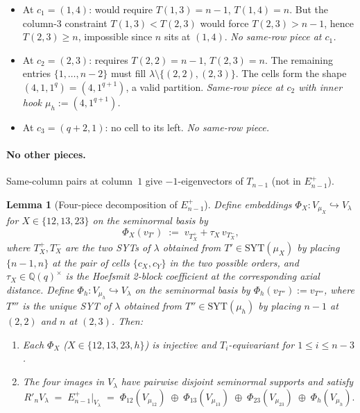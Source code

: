 \documentclass[11pt]{article}
\newtheorem{lemma}[theorem]{Lemma}
\theoremstyle{definition}
\newcommand{\SYT}{\mathrm{SYT}}
\newcommand{\Rp}{{R'}}
\begin{document}
\begin{itemize}[topsep=0.2em,itemsep=0.1em]
\item At $c_1 = (1, 4)$: would require $T(1, 3) = n-1$, $T(1, 4) = n$.
   But the column-$3$ constraint $T(1, 3) < T(2, 3)$ would force
   $T(2, 3) > n - 1$, hence $T(2, 3) \ge n$, impossible since $n$ sits
   at $(1, 4)$.  \emph{No same-row piece at $c_1$.}
\item At $c_2 = (2, 3)$: requires $T(2, 2) = n-1$, $T(2, 3) = n$.
   The remaining entries $\{1, \ldots, n-2\}$ must fill
   $\lambda \setminus \{(2, 2), (2, 3)\}$.  The cells form the shape
   $(4, 1, 1^q) = (4, 1^{q+1})$, a valid partition.
   \emph{Same-row piece at $c_2$ with inner hook $\mu_h := (4, 1^{q+1})$.}
\item At $c_3 = (q+2, 1)$: no cell to its left.  \emph{No same-row piece.}
\end{itemize}

\paragraph{No other pieces.}  Same-column pairs at column~$1$ give
$-1$-eigenvectors of $T_{n-1}$ (not in $E_{n-1}^+$).

\begin{lemma}[Four-piece decomposition of $E_{n-1}^+$]\label{lem:Eplus-decomp}
Define embeddings $\Phi_X : V_{\mu_X} \hookrightarrow V_\lambda$ for
$X \in \{12, 13, 23\}$ on the seminormal basis by
\[
   \Phi_X(v_{T'}) \;:=\; v_{T_X^+} + \tau_X\,v_{T_X^-},
\]
where $T_X^+, T_X^-$ are the two SYTs of $\lambda$ obtained from
$T' \in \SYT(\mu_X)$ by placing $\{n-1, n\}$ at the pair of cells
$\{c_X, c_Y\}$ in the two possible orders, and $\tau_X \in \mathbb{Q}(q)^\times$
is the Hoefsmit 2-block coefficient at the corresponding axial distance.
Define $\Phi_h : V_{\mu_h} \hookrightarrow V_\lambda$ on the seminormal
basis by $\Phi_h(v_{T''}) := v_{T'''}$, where $T'''$ is the unique SYT
of $\lambda$ obtained from $T'' \in \SYT(\mu_h)$ by placing $n-1$ at
$(2, 2)$ and $n$ at $(2, 3)$.  Then:

\begin{enumerate}[topsep=0.3em,itemsep=0.1em,leftmargin=2em,
                  label=(\roman*)]
\item Each $\Phi_X$ ($X \in \{12, 13, 23, h\}$) is injective and
   $T_i$-equivariant for $1 \le i \le n - 3$.
\item The four images in $V_\lambda$ have pairwise disjoint
   seminormal supports and satisfy
   \[
       \Rp_n V_\lambda \;=\; E_{n-1}^+|_{V_\lambda}
       \;=\; \Phi_{12}(V_{\mu_{12}}) \;\oplus\; \Phi_{13}(V_{\mu_{13}})
       \;\oplus\; \Phi_{23}(V_{\mu_{23}}) \;\oplus\; \Phi_h(V_{\mu_h}).
   \]
\end{enumerate}
\end{lemma}
\end{document}
